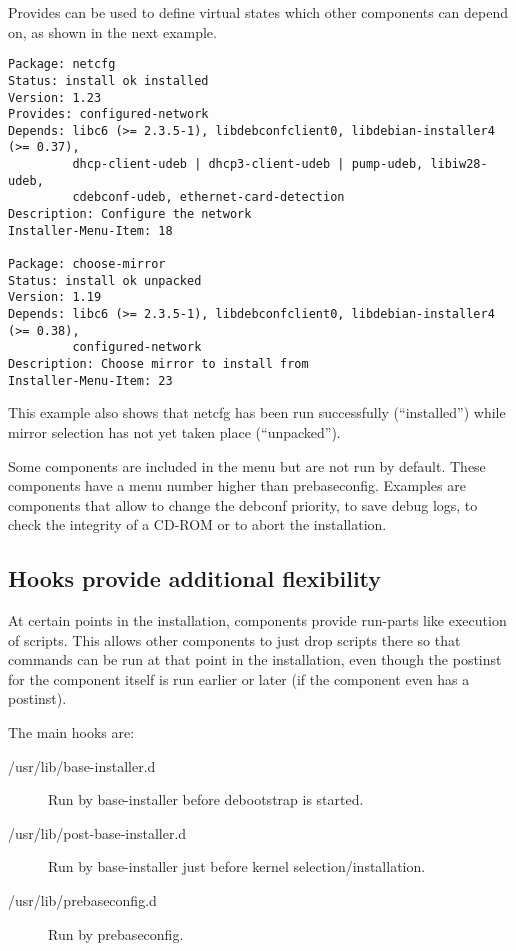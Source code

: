 \documentclass[a4paper,10pt]{article}
\begin{document}
Provides can be used to define virtual states which other components can depend on, as shown in the next example. 

\begin{verbatim}
Package: netcfg
Status: install ok installed
Version: 1.23
Provides: configured-network
Depends: libc6 (>= 2.3.5-1), libdebconfclient0, libdebian-installer4 (>= 0.37),
         dhcp-client-udeb | dhcp3-client-udeb | pump-udeb, libiw28-udeb,
         cdebconf-udeb, ethernet-card-detection
Description: Configure the network
Installer-Menu-Item: 18

Package: choose-mirror
Status: install ok unpacked
Version: 1.19
Depends: libc6 (>= 2.3.5-1), libdebconfclient0, libdebian-installer4 (>= 0.38),
         configured-network
Description: Choose mirror to install from
Installer-Menu-Item: 23
\end{verbatim}

This example also shows that netcfg has been run successfully (“installed”) while mirror selection has not yet taken place (“unpacked”). 

Some components are included in the menu but are not run by default. These components have a menu number higher than prebaseconfig. Examples are components that allow to change the debconf priority, to save debug logs, to check the integrity of a CD-ROM or to abort the installation. 


\subsection{Hooks provide additional flexibility}
At certain points in the installation, components provide run-parts like execution of scripts. This allows other components to just drop scripts there so that commands can be run at that point in the installation, even though the postinst for the component itself is run earlier or later (if the component even has a postinst). 

The main hooks are: 

\begin{description}
\item[/usr/lib/base-installer.d] Run by base-installer before debootstrap is started.
\item[/usr/lib/post-base-installer.d] Run by base-installer just before kernel selection/installation.
\item[/usr/lib/prebaseconfig.d] Run by prebaseconfig. 
\end{description}
\end{document}
